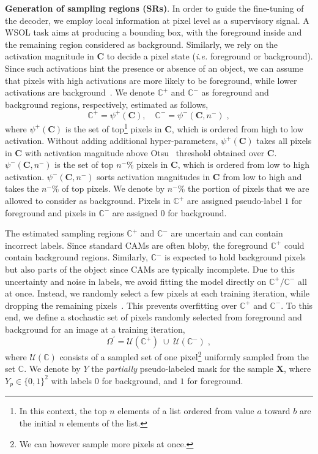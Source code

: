 \documentclass[twocolumn]{article}
\makeatletter
\theoremstyle{definition}
\newcommand*{\ie}{\emph{i.e.}\@\xspace}
\makeatother
\begin{document}
\noindent \textbf{Generation of sampling regions (SRs)}. In order to guide the fine-tuning of the decoder, we employ local information at pixel level as a supervisory signal. A WSOL task aims at producing a bounding box, with the foreground inside and the remaining region considered as background. Similarly, we rely on the activation magnitude in ${\bm{C}}$ to decide a pixel state (\ie foreground or background). Since such activations hint the presence or absence of an object, we can  assume that pixels with high activations are more likely to be foreground, while lower activations are background~\cite{durand2017wildcat}. We denote ${\mathbb{C}^+}$ and ${\mathbb{C}^-}$ as foreground and background regions, respectively, estimated as follows,
\begin{equation}
    \label{eq:sets}
    \mathbb{C}^+ = \psi^+(\bm{C}), \quad \mathbb{C}^- = \psi^-(\bm{C}, n^-) \;,
\end{equation}
where ${\psi^+(\bm{C})}$ is the set of top\footnote{In this context, the top $n$ elements of a list ordered from value $a$ toward $b$ are the initial $n$ elements of the list.} pixels in ${\bm{C}}$, which is ordered from high to low activation. Without adding additional hyper-parameters, ${\psi^+(\bm{C})}$ takes all pixels in ${\bm{C}}$ with activation magnitude above Otsu~\cite{otsuthresh} threshold obtained over ${\bm{C}}$. ${\psi^-(\bm{C}, n^-)}$ is the set of top ${n^-\%}$ pixels in ${\bm{C}}$, which is ordered from low to high activation.  ${\psi^-(\bm{C}, n^-)}$ sorts activation magnitudes in ${\bm{C}}$ from low to high and takes the ${n^-\%}$ of top pixels. We denote by ${n^-\%}$ the portion of pixels that we are allowed to consider as background. Pixels in ${\mathbb{C}^+}$ are assigned pseudo-label ${1}$ for foreground and pixels in ${\mathbb{C}^-}$ are assigned $0$ for background.

The estimated sampling regions ${\mathbb{C}^+}$ and ${\mathbb{C}^-}$ are uncertain and can contain incorrect labels. Since standard CAMs are often bloby, the foreground ${\mathbb{C}^+}$ could contain background regions. Similarly, ${\mathbb{C}^-}$  is expected to hold background pixels but also parts of the object since CAMs are typically incomplete. Due to this uncertainty and noise in labels, we avoid fitting the model directly on ${\mathbb{C}^+/ \mathbb{C}^-}$ all at once. Instead, we randomly select a few pixels at each training iteration, while dropping the remaining pixels~\cite{SinghL17,srivastava2014dropout}. This prevents overfitting over ${\mathbb{C}^+}$ and ${\mathbb{C}^-}$. To this end, we define a stochastic set of pixels randomly selected from foreground and background for an image at a training iteration,
\begin{equation}
    \label{eq:sset}
    \Omega^{\prime} = \mathcal{U}(\mathbb{C}^+)\; \cup \; \mathcal{U}(\mathbb{C}^-) \;,
\end{equation}
where ${\mathcal{U}(\mathbb{C})}$ consists of a sampled set of one pixel\footnote{We can however sample more pixels at once.} uniformly sampled from the set ${\mathbb{C}}$.  We denote by ${Y}$ the \emph{partially} pseudo-labeled mask for the sample ${\bm{X}}$, where ${Y_p \in \{0, 1\}^2}$ with labels ${0}$ for background, and ${1}$ for foreground.
\end{document}
